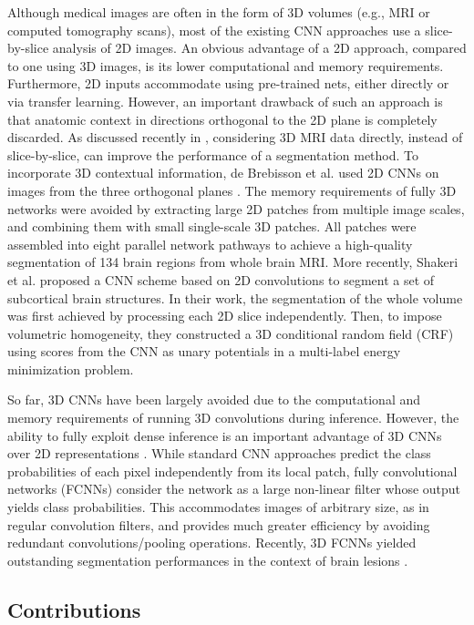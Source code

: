\documentclass[twoside,fleqn,espcrc2]{elsarticle}
\begin{document}
Although medical images are often in the form of 3D volumes (e.g., MRI or computed tomography scans), most of the existing CNN approaches use a slice-by-slice analysis of 2D images. An obvious advantage of a 2D approach, compared to one using 3D images, is its lower computational and memory requirements. Furthermore, 2D inputs accommodate using pre-trained nets, either directly or via transfer learning. However, an important drawback of such an approach is that anatomic context in directions orthogonal to the 2D plane is completely discarded. As discussed recently in \cite{milletari2016hough}, considering 3D MRI data directly, instead of slice-by-slice, can improve the performance of a segmentation method. To incorporate 3D contextual information, de Brebisson et al. used 2D CNNs on images from the three orthogonal planes \cite{Brebisson2015deep}. The memory requirements of fully 3D networks were avoided by extracting large 2D patches from multiple image scales, and combining them with small single-scale 3D patches. All patches were assembled into eight parallel network pathways to achieve a high-quality segmentation of 134 brain regions from whole brain MRI. More recently, Shakeri et al. \cite{shakeri2016sub} proposed a CNN scheme based on 2D convolutions to segment a set of subcortical brain structures. In their work, the segmentation of the whole volume was first achieved by processing each 2D slice independently. Then, to impose volumetric homogeneity, they constructed a 3D conditional random field (CRF) using scores from the CNN as unary potentials in a multi-label energy minimization problem.

So far, 3D CNNs have been largely avoided due to the computational and memory requirements of running 3D convolutions during inference. However, the ability to fully exploit dense inference is an important advantage of 3D CNNs over 2D representations \cite{szegedy2015going}. While standard CNN approaches predict the class probabilities of each pixel independently from its local patch, fully convolutional networks (FCNNs) \cite{long2015fully} consider the network as a large non-linear filter whose output yields class probabilities. This accommodates images of arbitrary size, as in regular convolution filters, and provides much greater efficiency by avoiding redundant convolutions/pooling operations. Recently, 3D FCNNs yielded outstanding segmentation performances in the context of brain lesions \cite{brosch2015deep,kamnitsas2016efficient}. 


\subsection{Contributions}
\end{document}
